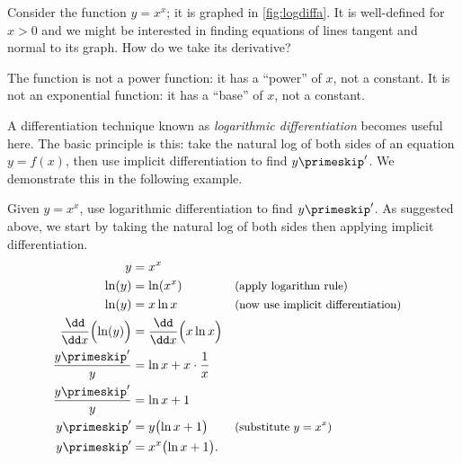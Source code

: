Consider the function $y=x^x$; it is graphed in \autoref{fig:logdiffa}. It is well-defined for $x>0$ and we might be interested in finding equations of lines tangent and normal to its graph. How do we take its derivative?

The function is not a power function: it has a ``power'' of $x$, not a constant. It is not an exponential function: it has a ``base'' of $x$, not a constant. 

A differentiation technique known as \emph{logarithmic differentiation} becomes useful here. The basic principle is this: take the natural log of both sides of an equation $y=f(x)$, then use implicit differentiation to find $y\primeskip'$. We demonstrate this in the following example.

\begin{example}\label{ex_implicit10}
Given $y=x^x$, use logarithmic differentiation to find $y\primeskip'$.
\solution
As suggested above, we start by taking the natural log of both sides then applying implicit differentiation.
\begin{align*}
y &= x^x \\
\ln (y) &= \ln (x^x) && \text{\small (apply logarithm rule)}\\
\ln (y) &= x\ln x && \text{\small (now use implicit differentiation)}\\
\frac{\dd}{\dd x}\Bigl(\ln (y)\Bigr) &= \frac{\dd}{\dd x}\Bigl(x\ln x\Bigr) \\
\frac{y\primeskip'}{y} &= \ln x + x\cdot\frac1x\\
\frac{y\primeskip'}{y} &= \ln x + 1\\
y\primeskip'
&= y\bigl(\ln x+1\bigr) && \text{\small (substitute $y=x^x$)}\\
y\primeskip' &= x^x\bigl(\ln x+1\bigr).
\end{align*} 



\end{example}
